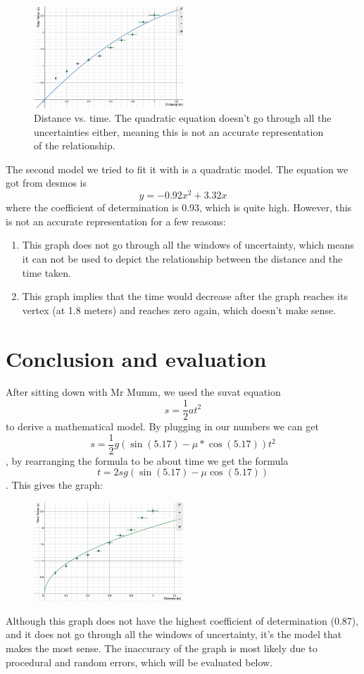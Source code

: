 \documentclass[12pt]{report}
\begin{document}
\begin{figure}
    \centering
    \includegraphics[width=0.5\textwidth]{graph2.png}
    \caption{Distance vs. time. The quadratic equation doesn’t go through all the uncertainties either, meaning this is not an accurate representation of the relationship.  }
\end{figure}
The second model we tried to fit it with is a quadratic model. The equation we got from desmos is \[y = -0.92x^2 + 3.32x\]
where the coefficient of determination is 0.93, which is quite high. However, this is not an accurate representation for a few reasons:
\begin{enumerate}
    \item This graph does not go through all the windows of uncertainty, which means it can not be used to depict the relationship between the distance and the time taken.
    \item This graph implies that the time would decrease after the graph reaches its vertex (at 1.8 meters) and reaches zero again, which doesn't make sense.
\end{enumerate}
\section{Conclusion and evaluation}
After sitting down with Mr Mumm, we used the suvat equation \[s = \frac{1}{2}at^2\] to derive a mathematical model. By plugging in our numbers we can get \[s = \frac{1}{2}g(\sin(5.17) - \mu*\cos(5.17)) t^2\], by rearranging the formula to be about time we get the formula \[t =2sg(\sin(5.17)-\mu \cos(5.17))\]. This gives the graph:
\begin{figure}
    \centering
    \includegraphics[width=0.5\textwidth]{graph3.png}
\end{figure}
Although this graph does not have the highest coefficient of determination (0.87), and it does not go through all the windows of uncertainty, it’s the model that makes the most sense. The inaccuracy of the graph is most likely due to procedural and random errors, which will be evaluated below.
\end{document}
